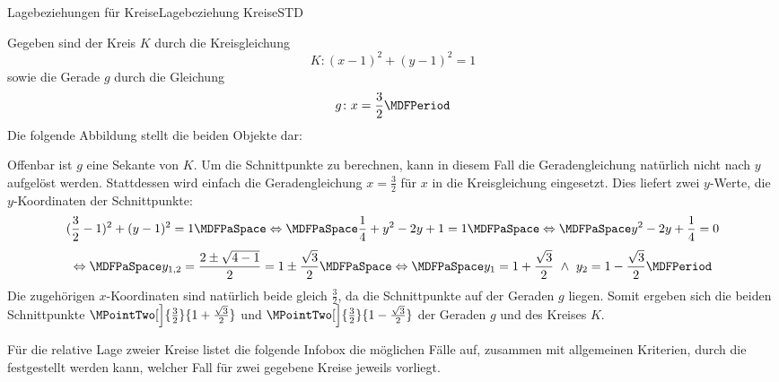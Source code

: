 \begin{MXContent}{Lagebeziehungen für Kreise}{Lagebeziehung Kreise}{STD}
\begin{MExample}
Gegeben sind der Kreis $K$ durch die Kreisgleichung
\[
 K\colon (x-1)^2+(y-1)^2=1
\]
sowie die Gerade $g$ durch die Gleichung
\[
 g\colon x=\frac{3}{2} \MDFPeriod
\]
Die folgende Abbildung stellt die beiden Objekte dar:
\begin{center}
\end{center} 
Offenbar ist $g$ eine Sekante von $K$. Um die Schnittpunkte zu berechnen, kann in diesem Fall die Geradengleichung natürlich nicht nach $y$ aufgelöst werden. Stattdessen wird einfach die Geradengleichung $x=\frac{3}{2}$ für $x$ in die Kreisgleichung eingesetzt. Dies liefert zwei $y$-Werte, die $y$-Koordinaten der Schnittpunkte:
\[
  (\frac{3}{2}-1)^2+(y-1)^2=1\MDFPaSpace\Leftrightarrow\MDFPaSpace \frac{1}{4}+y^2-2y+1=1 \MDFPaSpace\Leftrightarrow\MDFPaSpace y^2-2y+\frac{1}{4}=0
\]
\[
 \Leftrightarrow\MDFPaSpace y_{1,2}=\frac{2\pm\sqrt{4-1}}{2}=1\pm\frac{\sqrt{3}}{2}\MDFPaSpace\Leftrightarrow\MDFPaSpace y_1=1+\frac{\sqrt{3}}{2}\ \wedge\ y_2=1-\frac{\sqrt{3}}{2}\MDFPeriod
\]
Die zugehörigen $x$-Koordinaten sind natürlich beide gleich $\frac{3}{2}$, da die Schnittpunkte auf der Geraden $g$ liegen. Somit ergeben sich die beiden Schnittpunkte $\MPointTwo[\Big]{\frac{3}{2}}{1+\frac{\sqrt{3}}{2}}$ und $\MPointTwo[\Big]{\frac{3}{2}}{1-\frac{\sqrt{3}}{2}}$ der Geraden $g$ und des Kreises $K$.
\end{MExample}

Für die relative Lage zweier Kreise listet die folgende Infobox die möglichen Fälle auf, zusammen mit allgemeinen Kriterien, durch die festgestellt werden kann, welcher Fall für zwei gegebene Kreise jeweils vorliegt.


\end{MXContent}
